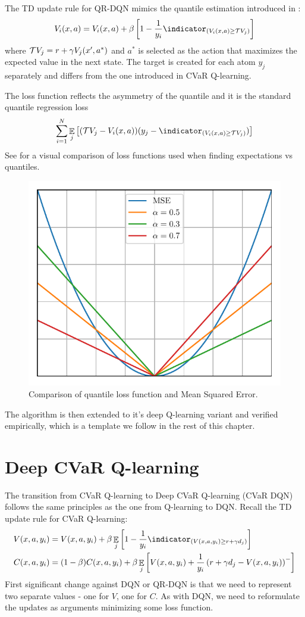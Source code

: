 The TD update rule for QR-DQN mimics the quantile estimation introduced in :
\begin{equation*}
V_i(x, a) = V_i(x, a) + \beta \bsquare{1-\dfrac{1}{y_i}\indicator_{(V_i(x, a) \ge \cT V_j)}}
\end{equation*}
where $\mathcal{T} V_j = r + \gamma V_j(x', a^*)$ and $a^*$ is selected as the action that maximizes the expected value in the next state. The target is created for each atom $y_j$ separately and differs from the one introduced in CVaR Q-learning.

The loss function reflects the asymmetry of the quantile and it is the standard quantile regression loss
\begin{equation}
\sum_{i=1}^{N} \expect_j\bsquare{(\cT V_j - V_i(x, a))(y_j - \indicator_{(V_i(x, a) \ge \cT V_j)})}
\end{equation}
See  for a visual comparison of loss functions used when finding expectations vs quantiles.

\begin{figure}[h]
\center
\includegraphics[width=0.6\linewidth]{gfx/losses.pdf}
\caption{Comparison of quantile loss function and Mean Squared Error.}
\label{fig:losses}
\end{figure}

The algorithm is then extended to it's deep Q-learning variant and verified empirically, which is a template we follow in the rest of this chapter.

\section{Deep CVaR Q-learning}
The transition from CVaR Q-learning to Deep CVaR Q-learning (CVaR DQN) follows the same principles as the one from Q-learning to DQN. Recall the TD update rule for CVaR Q-learning:
\begin{align*}
V(x, a, y_i) &= V(x, a, y_i) + \beta \expect_j\bsquare{1 - \dfrac{1}{y_i}\indicator_{(V(x, a, y_i) \ge r+\gamma d_j)}}\\
C(x, a, y_i) &= (1-\beta)C(x, a, y_i) + \beta\expect_j\bsquare{V(x, a, y_i) + \dfrac{1}{y_i}\bround{r+\gamma d_j - V(x, a, y_i)}^-}
\end{align*}
First significant change against DQN or QR-DQN is that we need to represent two separate values - one for $V$, one for $C$. As with DQN, we need to reformulate the updates as arguments minimizing some loss function.

